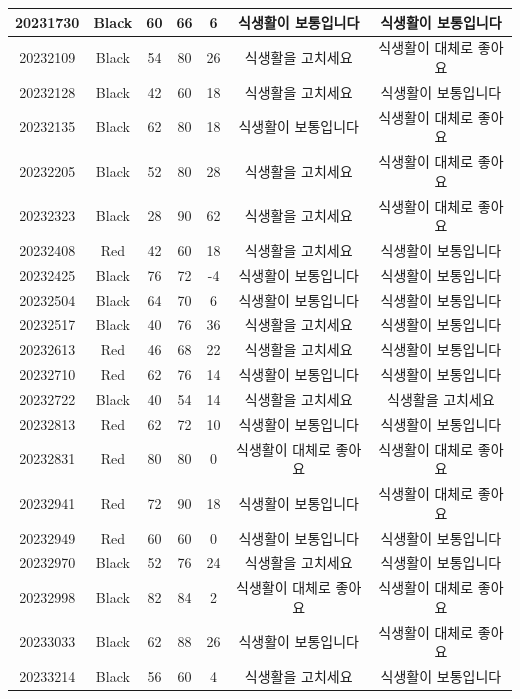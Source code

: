 \documentclass[
]{book}
\begin{document}
\begin{tabular}{c|c|c|c|c|c|c}
\hline
20231730 & Black & 60 & 66 & 6 & 식생활이 보통입니다 & 식생활이 보통입니다\\
\hline
20232109 & Black & 54 & 80 & 26 & 식생활을 고치세요 & 식생활이 대체로 좋아요\\
\hline
20232128 & Black & 42 & 60 & 18 & 식생활을 고치세요 & 식생활이 보통입니다\\
\hline
20232135 & Black & 62 & 80 & 18 & 식생활이 보통입니다 & 식생활이 대체로 좋아요\\
\hline
20232205 & Black & 52 & 80 & 28 & 식생활을 고치세요 & 식생활이 대체로 좋아요\\
\hline
20232323 & Black & 28 & 90 & 62 & 식생활을 고치세요 & 식생활이 대체로 좋아요\\
\hline
20232408 & Red & 42 & 60 & 18 & 식생활을 고치세요 & 식생활이 보통입니다\\
\hline
20232425 & Black & 76 & 72 & -4 & 식생활이 보통입니다 & 식생활이 보통입니다\\
\hline
20232504 & Black & 64 & 70 & 6 & 식생활이 보통입니다 & 식생활이 보통입니다\\
\hline
20232517 & Black & 40 & 76 & 36 & 식생활을 고치세요 & 식생활이 보통입니다\\
\hline
20232613 & Red & 46 & 68 & 22 & 식생활을 고치세요 & 식생활이 보통입니다\\
\hline
20232710 & Red & 62 & 76 & 14 & 식생활이 보통입니다 & 식생활이 보통입니다\\
\hline
20232722 & Black & 40 & 54 & 14 & 식생활을 고치세요 & 식생활을 고치세요\\
\hline
20232813 & Red & 62 & 72 & 10 & 식생활이 보통입니다 & 식생활이 보통입니다\\
\hline
20232831 & Red & 80 & 80 & 0 & 식생활이 대체로 좋아요 & 식생활이 대체로 좋아요\\
\hline
20232941 & Red & 72 & 90 & 18 & 식생활이 보통입니다 & 식생활이 대체로 좋아요\\
\hline
20232949 & Red & 60 & 60 & 0 & 식생활이 보통입니다 & 식생활이 보통입니다\\
\hline
20232970 & Black & 52 & 76 & 24 & 식생활을 고치세요 & 식생활이 보통입니다\\
\hline
20232998 & Black & 82 & 84 & 2 & 식생활이 대체로 좋아요 & 식생활이 대체로 좋아요\\
\hline
20233033 & Black & 62 & 88 & 26 & 식생활이 보통입니다 & 식생활이 대체로 좋아요\\
\hline
20233214 & Black & 56 & 60 & 4 & 식생활을 고치세요 & 식생활이 보통입니다\\

\end{tabular}
\end{document}

